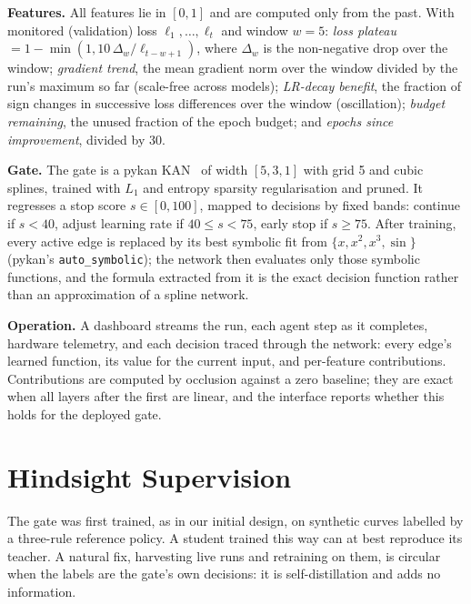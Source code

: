 \documentclass[conference]{IEEEtran}
\begin{document}
\textbf{Features.} All features lie in $[0,1]$ and are computed only from the past. With monitored (validation) loss $\ell_1,\dots,\ell_t$ and window $w=5$: \emph{loss plateau} $=1-\min(1, 10\,\Delta_w/\ell_{t-w+1})$, where $\Delta_w$ is the non-negative drop over the window; \emph{gradient trend}, the mean gradient norm over the window divided by the run's maximum so far (scale-free across models); \emph{LR-decay benefit}, the fraction of sign changes in successive loss differences over the window (oscillation); \emph{budget remaining}, the unused fraction of the epoch budget; and \emph{epochs since improvement}, divided by 30.

\textbf{Gate.} The gate is a pykan KAN~\cite{liu2025kan,liu2024kan2} of width $[5,3,1]$ with grid 5 and cubic splines, trained with $L_1$ and entropy sparsity regularisation and pruned. It regresses a stop score $s\in[0,100]$, mapped to decisions by fixed bands: continue if $s<40$, adjust learning rate if $40\le s<75$, early stop if $s\ge75$. After training, every active edge is replaced by its best symbolic fit from $\{x, x^2, x^3, \sin\}$ (pykan's \texttt{auto\_symbolic}); the network then evaluates only those symbolic functions, and the formula extracted from it is the exact decision function rather than an approximation of a spline network.

\textbf{Operation.} A dashboard streams the run, each agent step as it completes, hardware telemetry, and each decision traced through the network: every edge's learned function, its value for the current input, and per-feature contributions. Contributions are computed by occlusion against a zero baseline; they are exact when all layers after the first are linear, and the interface reports whether this holds for the deployed gate.

\section{Hindsight Supervision}
\label{sec:hindsight}
The gate was first trained, as in our initial design, on synthetic curves labelled by a three-rule reference policy. A student trained this way can at best reproduce its teacher. A natural fix, harvesting live runs and retraining on them, is circular when the labels are the gate's own decisions: it is self-distillation and adds no information.
\end{document}
